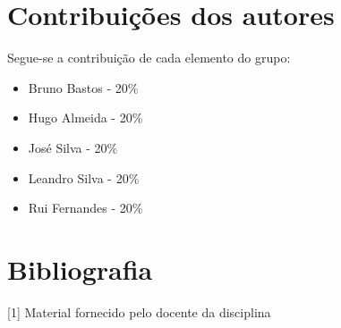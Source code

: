 \documentclass[10pt,portuguese]{article}
\begin{document}
\section{Contribuições dos autores}
\par Segue-se a contribuição de cada elemento do grupo:
\begin{itemize}
    \item Bruno Bastos -  20\%
	\item Hugo Almeida - 20\%
	\item José Silva - 20\%
    \item Leandro Silva - 20\%
	\item Rui Fernandes - 20\%
\end{itemize}

\clearpage

\section{Bibliografia}





\vspace{5mm} %

[1] Material fornecido pelo docente da disciplina
\end{document}
